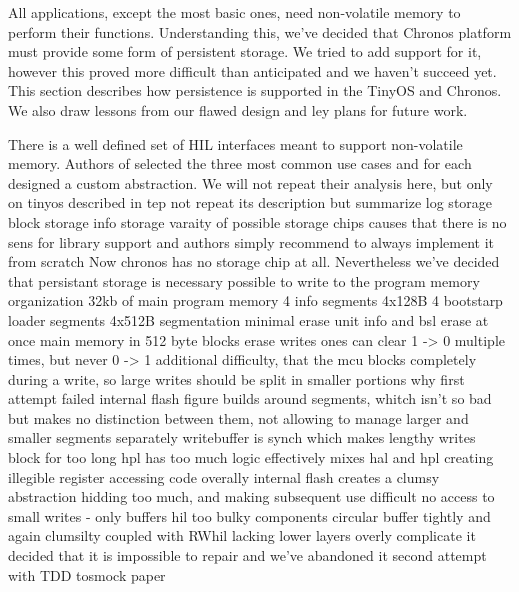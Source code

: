 All applications, except the most basic ones, need non-volatile memory to perform their functions. Understanding this, we've decided that Chronos platform must provide some form of persistent storage. We tried to add support for it, however this proved more difficult than anticipated and we haven't succeed yet. This section describes how persistence is supported in the TinyOS and Chronos. We also draw lessons from our flawed design and ley plans for future work.

There is a well defined set of HIL interfaces meant to support non-volatile memory. Authors of \cite{TEP103} selected the three most common use cases and for each designed a custom abstraction. We will not repeat their analysis here, but only 
  on tinyos
    described in tep
    not repeat its description but summarize
      log storage
      block storage
      info storage
  varaity of possible storage chips causes that there is no sens for library support and authors simply recommend to always implement it from scratch
  Now chronos has no storage chip at all.
  Nevertheless we've decided that persistant storage is necessary
  possible to write to the program memory
  organization
    32kb of main program memory
    4 info segments 4x128B
    4 bootstarp loader segments 4x512B
  segmentation
    minimal erase unit
    info and bsl erase at once
    main memory in 512 byte blocks
  erase writes ones
    can clear 1 -> 0 multiple times, but never 0 -> 1
  additional difficulty, that the mcu blocks completely during a write, so large writes should be split in smaller portions
  why first attempt failed
    internal flash
      figure
      builds around segments, whitch isn't so bad
      but makes no distinction between them, not allowing to manage larger and smaller segments separately
      writebuffer is synch which makes lengthy writes block for too long
      hpl has too much logic effectively mixes hal and hpl creating illegible register accessing code
      overally internal flash creates a clumsy abstraction hidding too much, and making subsequent use difficult
      no access to small writes - only buffers
    hil
      too bulky components
      circular buffer tightly and again clumsilty coupled with RWhil
      lacking lower layers overly complicate it
    decided that it is impossible to repair and we've abandoned it
  second attempt with TDD
    tosmock
    paper




